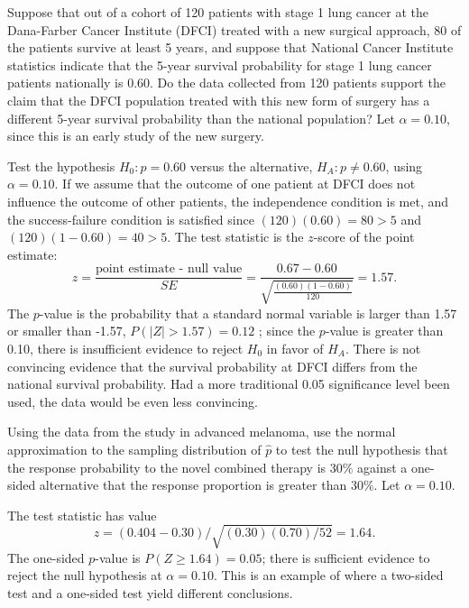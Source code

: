 \begin{examplewrap}
\begin{nexample}{Suppose that out of a cohort of 120 patients with stage 1 lung cancer at the Dana-Farber Cancer Institute (DFCI) treated with a new surgical approach, 80 of the patients survive at least 5 years, and suppose that National Cancer Institute statistics indicate that the 5-year survival probability for stage 1 lung cancer patients nationally is 0.60. Do the data collected from 120 patients support the claim that the DFCI population treated with this new form of surgery has a different 5-year survival probability than the national population? Let $\alpha = 0.10$, since this is an early study of the new surgery.}

Test the hypothesis $H_0: p = 0.60$ versus the alternative, $H_A:  p \neq 0.60$, using $\alpha = 0.10$. If we assume that the outcome of one patient at DFCI does not influence the outcome of other patients, the independence condition is met, and the success-failure condition is satisfied since $(120)(0.60) = 80 > 5$ and $(120)(1-0.60) = 40 > 5.$ The test statistic is the $z$-score of the point estimate: 
\[z = \dfrac{\text{point estimate - null value}}{SE} = \dfrac{0.67 - 0.60}{\sqrt{\frac{(0.60)(1-0.60)}{120}}} = 1.57. \]
The $p$-value is the probability that a standard normal variable is larger than 1.57 or smaller than -1.57, $P(|Z| > 1.57) = 0.12$ ; since the $p$-value is greater than 0.10, there is insufficient evidence to reject $H_0$ in favor of $H_A$. There is not convincing evidence that the survival probability at DFCI differs from the national survival probability.  Had a more traditional 0.05 significance level been used, the data would be even less convincing. 
\end{nexample}
\end{examplewrap}

\begin{examplewrap}
\begin{nexample}{Using the data from the study in advanced melanoma, use the normal approximation to the sampling distribution of $\hat{p}$ to test the null hypothesis that the response probability to the novel combined therapy is 30\% against a one-sided alternative that the response proportion is greater than 30\%. Let $\alpha = 0.10$.}

The test statistic has value 
\[
z = (0.404 - 0.30)/\sqrt{(0.30)(0.70)/52} = 1.64. 
\] 
The one-sided $p$-value is $P(Z \geq 1.64) = 0.05$; there is sufficient evidence to reject the null hypothesis at $\alpha = 0.10$. This is an example of where a two-sided test and a one-sided test yield different conclusions.
\end{nexample}
\end{examplewrap}

